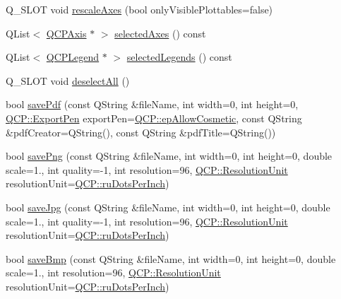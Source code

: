 \begin{DoxyCompactItemize}
Q\+\_\+\+S\+L\+OT void \mbox{\hyperlink{class_q_custom_plot_ad86528f2cee6c7e446dea4a6e8839935}{rescale\+Axes}} (bool only\+Visible\+Plottables=false)
\item 
Q\+List$<$ \mbox{\hyperlink{class_q_c_p_axis}{Q\+C\+P\+Axis}} $\ast$ $>$ \mbox{\hyperlink{class_q_custom_plot_a7e6b07792b1cb2c31681596582d14dbe}{selected\+Axes}} () const
\item 
Q\+List$<$ \mbox{\hyperlink{class_q_c_p_legend}{Q\+C\+P\+Legend}} $\ast$ $>$ \mbox{\hyperlink{class_q_custom_plot_ac87624ddff1cbf4064781a8e8ae321c4}{selected\+Legends}} () const
\item 
Q\+\_\+\+S\+L\+OT void \mbox{\hyperlink{class_q_custom_plot_a9d4808ab925b003054085246c92a257c}{deselect\+All}} ()
\item 
bool \mbox{\hyperlink{class_q_custom_plot_ad5acd34f6b39c3516887d7e54fec2412}{save\+Pdf}} (const Q\+String \&file\+Name, int width=0, int height=0, \mbox{\hyperlink{namespace_q_c_p_a17844f19e1019693a953e1eb93536d2f}{Q\+C\+P\+::\+Export\+Pen}} export\+Pen=\mbox{\hyperlink{namespace_q_c_p_a17844f19e1019693a953e1eb93536d2fa50d3657dba3fb90560b93a823cb0a6e8}{Q\+C\+P\+::ep\+Allow\+Cosmetic}}, const Q\+String \&pdf\+Creator=Q\+String(), const Q\+String \&pdf\+Title=Q\+String())
\item 
bool \mbox{\hyperlink{class_q_custom_plot_ac92cc9256d12f354b40a4be4600b5fb9}{save\+Png}} (const Q\+String \&file\+Name, int width=0, int height=0, double scale=1., int quality=-\/1, int resolution=96, \mbox{\hyperlink{namespace_q_c_p_a715d46153da230990aa887d0f0602452}{Q\+C\+P\+::\+Resolution\+Unit}} resolution\+Unit=\mbox{\hyperlink{namespace_q_c_p_a715d46153da230990aa887d0f0602452affb887d8efe79c39a1aca2acd7002afc}{Q\+C\+P\+::ru\+Dots\+Per\+Inch}})
\item 
bool \mbox{\hyperlink{class_q_custom_plot_a76f0d278e630a711fa6f48048cfd83e4}{save\+Jpg}} (const Q\+String \&file\+Name, int width=0, int height=0, double scale=1., int quality=-\/1, int resolution=96, \mbox{\hyperlink{namespace_q_c_p_a715d46153da230990aa887d0f0602452}{Q\+C\+P\+::\+Resolution\+Unit}} resolution\+Unit=\mbox{\hyperlink{namespace_q_c_p_a715d46153da230990aa887d0f0602452affb887d8efe79c39a1aca2acd7002afc}{Q\+C\+P\+::ru\+Dots\+Per\+Inch}})
\item 
bool \mbox{\hyperlink{class_q_custom_plot_ae3a86ed0795670e50afa21759d4fa13d}{save\+Bmp}} (const Q\+String \&file\+Name, int width=0, int height=0, double scale=1., int resolution=96, \mbox{\hyperlink{namespace_q_c_p_a715d46153da230990aa887d0f0602452}{Q\+C\+P\+::\+Resolution\+Unit}} resolution\+Unit=\mbox{\hyperlink{namespace_q_c_p_a715d46153da230990aa887d0f0602452affb887d8efe79c39a1aca2acd7002afc}{Q\+C\+P\+::ru\+Dots\+Per\+Inch}})

\end{DoxyCompactItemize}
